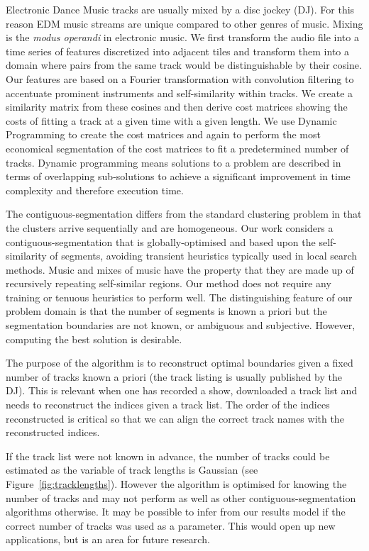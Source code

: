 \documentclass[twocolumn]{article}
\begin{document}
	Electronic Dance Music tracks are usually mixed by a disc jockey (DJ). For this reason EDM music streams are unique compared to other genres of music. Mixing is the \textit{modus operandi} in electronic music. We first transform the audio file into a time series of features discretized into adjacent tiles and transform them into a domain where pairs from the same track would be distinguishable by their cosine. Our features are based on a Fourier transformation with convolution filtering to accentuate prominent instruments and self-similarity within tracks. We create a similarity matrix from these cosines and then derive cost matrices showing the costs of fitting a track at a given time with a given length. We use Dynamic Programming to create the cost matrices and again to perform the most economical segmentation of the cost matrices to fit a predetermined number of tracks. Dynamic programming means solutions to a problem are described in terms of overlapping sub-solutions to achieve a significant improvement in time complexity and therefore execution time. 
	
	The contiguous-segmentation differs from the standard clustering problem in that the clusters arrive sequentially and are homogeneous. Our work considers a contiguous-segmentation that is globally-optimised and based upon the self-similarity of segments, avoiding transient heuristics typically used in local search methods. Music and mixes of music have the property that they are made up of recursively repeating self-similar regions. Our method does not require any training or tenuous heuristics to perform well. The distinguishing feature of our problem domain is that the number of segments is known a priori but the segmentation boundaries are not known, or ambiguous and subjective. However, computing the best solution is desirable.
	
	The purpose of the algorithm is to reconstruct optimal boundaries given a fixed number of tracks known a priori (the track listing is usually published by the DJ). This is relevant when one has recorded a show, downloaded a track list and needs to reconstruct the indices given a track list. The order of the indices reconstructed is critical so that we can align the correct track names with the reconstructed indices. 
	
	If the track list were not known in advance, the number of tracks could be estimated as the variable of track lengths is Gaussian (see Figure~\ref{fig:tracklengths}). However the algorithm is optimised for knowing the number of tracks and may not perform as well as other contiguous-segmentation algorithms otherwise. It may be possible to infer from our results model if the correct number of tracks was used as a parameter. This would open up new applications, but is an area for future research. 
	
\end{document}
